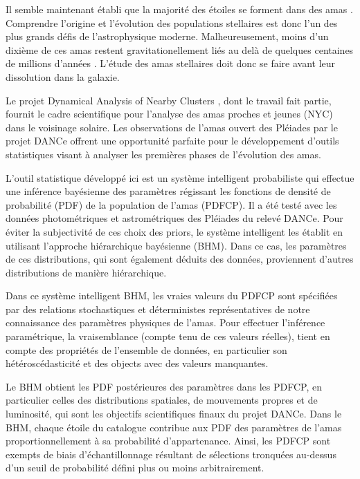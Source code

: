 

Il semble maintenant établi que la majorité des étoiles se forment dans des amas \citep{2000AJ....120.3139C, 2003AJ....126.1916P,2003ARA&A..41...57L}. Comprendre l'origine et l'évolution des populations stellaires est donc l'un des plus grands défis de l'astrophysique moderne. Malheureusement, moins d'un dixième de ces amas restent gravitationellement liés au delà de quelques centaines de millions d'années \citep{2003ARA&A..41...57L}. L’étude des amas stellaires doit donc se faire avant leur dissolution dans la galaxie.

Le projet Dynamical Analysis of Nearby Clusters \cite[DANCe,][]{Bouy2013}, dont le travail fait partie, fournit le cadre scientifique pour l'analyse des amas proches et jeunes (NYC) dans le voisinage solaire. Les observations de l'amas ouvert des Pléiades par le projet DANCe offrent une opportunité parfaite pour le développement d'outils statistiques visant à analyser les premières phases de l'évolution des amas.

L'outil statistique développé ici est un système intelligent probabiliste qui effectue une inférence bayésienne des paramètres régissant les fonctions de densité de probabilité (PDF) de la population de l'amas (PDFCP). Il a été testé avec les données photométriques et astrométriques des Pléiades du relevé DANCe. Pour éviter la subjectivité de ces choix des priors, le système intelligent les établit en utilisant l'approche hiérarchique bayésienne (BHM). Dans ce cas, les paramètres de ces distributions, qui sont également déduits des données, proviennent d'autres distributions de manière hiérarchique.

Dans ce système intelligent BHM, les vraies valeurs du PDFCP sont spécifiées par des relations stochastiques et déterministes représentatives de notre connaissance des paramètres physiques de l'amas. Pour effectuer l'inférence paramétrique, la vraisemblance (compte tenu de ces valeurs réelles), tient en compte des propriétés de l'ensemble de données, en particulier son hétéroscédasticité et des objects avec des valeurs manquantes.

Le BHM obtient les PDF postérieures des paramètres dans les PDFCP, en particulier celles des distributions spatiales, de mouvements propres et de luminosité, qui sont les objectifs scientifiques finaux du projet DANCe. Dans le BHM, chaque étoile du catalogue contribue aux PDF des paramètres de l'amas proportionnellement à sa probabilité d'appartenance. Ainsi, les PDFCP sont exempts de biais d'échantillonnage résultant de sélections tronquées au-dessus d'un seuil de probabilité défini plus ou moins arbitrairement.


